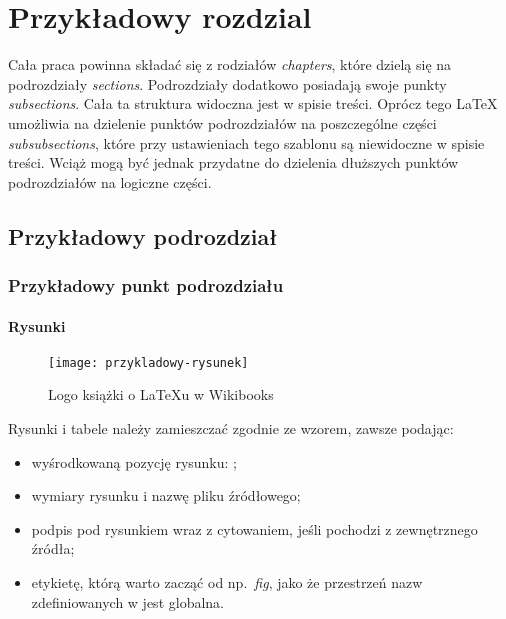 \chapter{Przykładowy rozdzial}
\label{chpt:przykladowy-rozdzial}

Cała praca powinna składać się z rodziałów \emph{chapters}, które dzielą
się na podrozdziały \emph{sections}. Podrozdziały dodatkowo
posiadają swoje punkty \emph{subsections}. Cała ta struktura widoczna
jest w spisie treści. Oprócz tego LaTeX umożliwia na dzielenie punktów
podrozdziałów na poszczególne części \emph{subsubsections}, które przy
ustawieniach tego szablonu są niewidoczne w spisie treści. Wciąż mogą
być jednak przydatne do dzielenia dłuższych punktów podrozdziałów na
logiczne części.

\section{Przykładowy podrozdział}

\subsection{Przykładowy punkt podrozdziału}

\subsubsection{Rysunki}

\begin{figure}[!htb]
    \centering
    \texttt{[image: przykladowy-rysunek]}
    \caption{Logo książki o LaTeXu w Wikibooks
    \cite{book:latex}}
    \label{fig:przykladowy-rysunek}
\end{figure}

Rysunki i tabele należy zamieszczać zgodnie ze wzorem, zawsze podając:

\begin{itemize}
    \item wyśrodkowaną pozycję rysunku: ;
    \item wymiary rysunku i nazwę pliku źródłowego;
    \item podpis pod rysunkiem wraz z cytowaniem, jeśli pochodzi
    z zewnętrznego źródła;
    \item etykietę, którą warto zacząć od np.\ \emph{fig}, jako że
    przestrzeń nazw zdefiniowanych w  jest
    globalna.
\end{itemize}

